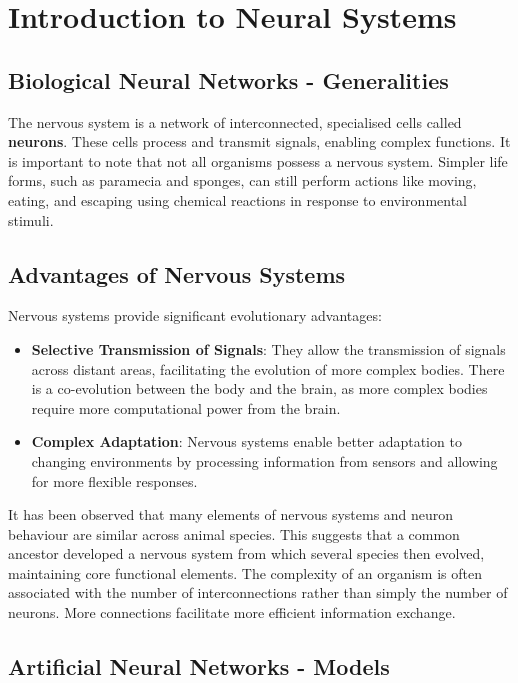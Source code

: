 \section{Introduction to Neural Systems}

\subsection*{Biological Neural Networks - Generalities}

The nervous system is a network of interconnected, specialised cells called \textbf{neurons}. These cells process and transmit signals, enabling complex functions. It is important to note that not all organisms possess a nervous system. Simpler life forms, such as paramecia and sponges, can still perform actions like moving, eating, and escaping using chemical reactions in response to environmental stimuli.

\subsection*{Advantages of Nervous Systems}

Nervous systems provide significant evolutionary advantages:

\begin{itemize}
    \item \textbf{Selective Transmission of Signals}: They allow the transmission of signals across distant areas, facilitating the evolution of more complex bodies. There is a co-evolution between the body and the brain, as more complex bodies require more computational power from the brain.
    \item \textbf{Complex Adaptation}:  Nervous systems enable better adaptation to changing environments by processing information from sensors and allowing for more flexible responses.
\end{itemize}
It has been observed that many elements of nervous systems and neuron behaviour are similar across animal species. This suggests that a common ancestor developed a nervous system from which several species then evolved, maintaining core functional elements. The complexity of an organism is often associated with the number of interconnections rather than simply the number of neurons. More connections facilitate more efficient information exchange.

\subsection*{Artificial Neural Networks - Models}

